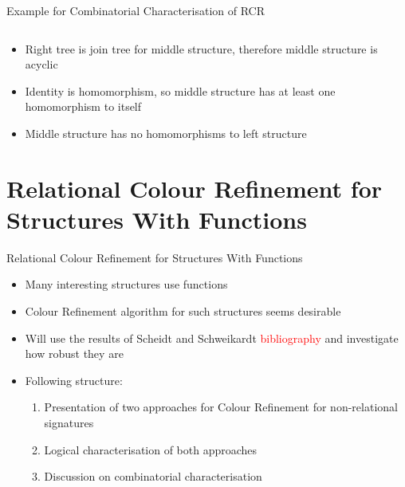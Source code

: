 \documentclass[aspectratio=169]{beamer}
\begin{document}
\begin{frame}{Example for Combinatorial Characterisation of RCR}
\begin{columns}
\begin{column}{0.33\textwidth}
			\end{column}
		\end{columns}
		\vspace{10pt}
		\begin{itemize}
			\item Right tree is join tree for middle structure, therefore middle structure is acyclic
			\item Identity is homomorphism, so middle structure has at least one homomorphism to itself
			\item Middle structure has no homomorphisms to left structure
		\end{itemize}
	\end{frame}
	
	\section{Relational Colour Refinement for Structures With Functions}
	
	\begin{frame}{Relational Colour Refinement for Structures With Functions}
		\begin{itemize}
			\item Many interesting structures use functions
			\item Colour Refinement algorithm for such structures seems desirable
			\item Will use the results of Scheidt and Schweikardt \textcolor{red}{bibliography} and investigate how robust they are
			\item Following structure:
			\begin{enumerate}
				\item Presentation of two approaches for Colour Refinement for non-relational signatures
				\item Logical characterisation of both approaches
				\item Discussion on combinatorial characterisation
			\end{enumerate}
		\end{itemize}
	\end{frame}
	
\end{document}

